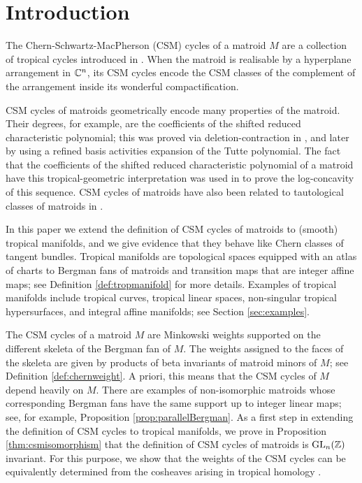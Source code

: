 


\section{Introduction}

The Chern-Schwartz-MacPherson (CSM) cycles of a matroid $M$ are a collection of tropical cycles introduced in \cite{LdMRS}. 
When the matroid is realisable by a hyperplane arrangement in ${\mathbb C}^n$, 
its CSM cycles encode the CSM classes of the complement of the arrangement inside its 
wonderful compactification.

CSM cycles of matroids geometrically encode many properties of the matroid. 
Their degrees, for example, are the coefficients of the shifted reduced characteristic
polynomial; 
this was proved via deletion-contraction in \cite{LdMRS}, and later by \cite{AshrafBackman} using a refined basis activities expansion of the Tutte polynomial. 
The fact that the coefficients of the shifted reduced characteristic polynomial of a matroid have this tropical-geometric interpretation was used in 
\cite{ADH} to prove the log-concavity 
of this sequence.
CSM cycles of matroids have also been related to tautological classes of matroids in \cite{BEST}.

In this paper we extend the definition of CSM cycles of matroids to (smooth) tropical manifolds,
and we give evidence that they behave like Chern classes of tangent bundles.
Tropical manifolds are topological spaces 
equipped with an atlas of charts to Bergman fans of matroids 
and transition maps that are integer affine maps; 
see Definition \ref{def:tropmanifold} for more details. 
Examples of tropical manifolds include tropical curves, tropical linear spaces, 
non-singular tropical hypersurfaces, and integral affine manifolds; see Section \ref{sec:examples}.


The CSM cycles of a matroid $M$ are Minkowski weights supported on the different skeleta of the Bergman fan of $M$. 
The weights assigned to the faces of the skeleta are given by products of beta invariants of matroid minors of $M$; see Definition \ref{def:chernweight}. 
A priori, this means that the CSM cycles of $M$ depend heavily on $M$. 
There are examples of non-isomorphic matroids whose corresponding Bergman fans have the same support up to integer linear maps; see, for example, Proposition \ref{prop:parallelBergman}.  
As a first step in extending the definition of CSM cycles to tropical manifolds, we prove in Proposition  \ref{thm:csmisomorphism} that the definition of CSM cycles of matroids 
is ${\rm GL}_n({\mathbb Z})$ invariant. 
For this purpose, we show that the weights of the CSM cycles can be equivalently determined from the cosheaves arising in tropical homology \cite{IKMZ}. 

